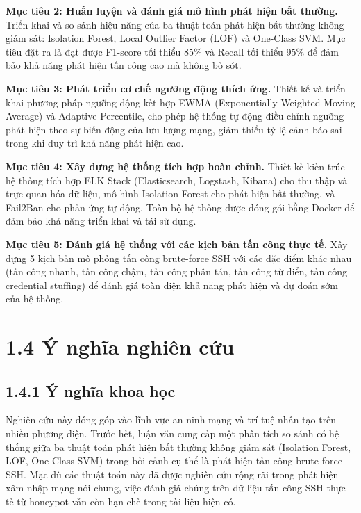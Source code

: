 \documentclass[
  a4paper]{report}
\begin{document}
\textbf{Mục tiêu 2: Huấn luyện và đánh giá mô hình phát hiện bất
thường.} Triển khai và so sánh hiệu năng của ba thuật toán phát hiện bất
thường không giám sát: Isolation Forest, Local Outlier Factor (LOF) và
One-Class SVM. Mục tiêu đặt ra là đạt được F1-score tối thiểu 85\% và
Recall tối thiểu 95\% để đảm bảo khả năng phát hiện tấn công cao mà
không bỏ sót.

\textbf{Mục tiêu 3: Phát triển cơ chế ngưỡng động thích ứng.} Thiết kế
và triển khai phương pháp ngưỡng động kết hợp EWMA (Exponentially
Weighted Moving Average) và Adaptive Percentile, cho phép hệ thống tự
động điều chỉnh ngưỡng phát hiện theo sự biến động của lưu lượng mạng,
giảm thiểu tỷ lệ cảnh báo sai trong khi duy trì khả năng phát hiện cao.

\textbf{Mục tiêu 4: Xây dựng hệ thống tích hợp hoàn chỉnh.} Thiết kế
kiến trúc hệ thống tích hợp ELK Stack (Elasticsearch, Logstash, Kibana)
cho thu thập và trực quan hóa dữ liệu, mô hình Isolation Forest cho phát
hiện bất thường, và Fail2Ban cho phản ứng tự động. Toàn bộ hệ thống được
đóng gói bằng Docker để đảm bảo khả năng triển khai và tái sử dụng.

\textbf{Mục tiêu 5: Đánh giá hệ thống với các kịch bản tấn công thực
tế.} Xây dựng 5 kịch bản mô phỏng tấn công brute-force SSH với các đặc
điểm khác nhau (tấn công nhanh, tấn công chậm, tấn công phân tán, tấn
công từ điển, tấn công credential stuffing) để đánh giá toàn diện khả
năng phát hiện và dự đoán sớm của hệ thống.

\section{1.4 Ý nghĩa nghiên
cứu}\label{uxfd-nghux129a-nghiuxean-cux1ee9u}

\subsection{1.4.1 Ý nghĩa khoa học}\label{uxfd-nghux129a-khoa-hux1ecdc}

Nghiên cứu này đóng góp vào lĩnh vực an ninh mạng và trí tuệ nhân tạo
trên nhiều phương diện. Trước hết, luận văn cung cấp một phân tích so
sánh có hệ thống giữa ba thuật toán phát hiện bất thường không giám sát
(Isolation Forest, LOF, One-Class SVM) trong bối cảnh cụ thể là phát
hiện tấn công brute-force SSH. Mặc dù các thuật toán này đã được nghiên
cứu rộng rãi trong phát hiện xâm nhập mạng nói chung, việc đánh giá
chúng trên dữ liệu tấn công SSH thực tế từ honeypot vẫn còn hạn chế
trong tài liệu hiện có.
\end{document}
